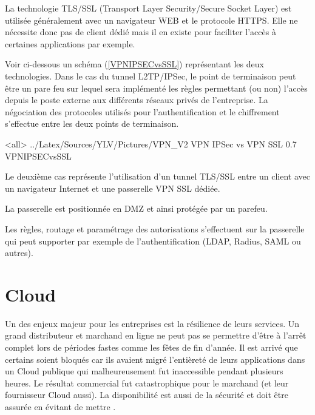 La technologie TLS/SSL (Transport Layer Security/Secure Socket Layer) est utilisée généralement avec un navigateur WEB et le protocole HTTPS. Elle ne nécessite donc pas de client dédié mais il en existe pour faciliter l'accès à certaines applications par exemple.

Voir ci-dessous un schéma (\ref{VPNIPSECvsSSL}) représentant les deux technologies.
Dans le cas du tunnel L2TP/IPSec, le point de terminaison peut être un pare feu sur lequel sera implémenté les règles permettant (ou non) l'accès depuis le poste externe aux différents réseaux privés de l'entreprise. La négociation des protocoles utilisés pour l'authentification et le chiffrement s'effectue entre les deux points de terminaison.

\mode<all>{\picframe
{../Latex/Sources/YLV/Pictures/VPN_V2}%
{VPN IPSec vs VPN SSL} %
{0.7} %
{VPNIPSECvsSSL} %
}

Le deuxième cas représente l'utilisation d'un tunnel TLS/SSL entre un client avec un navigateur Internet et une passerelle VPN SSL dédiée. 

La passerelle est positionnée en DMZ et ainsi protégée par un parefeu.

Les règles, routage et paramétrage des autorisations s'effectuent sur la passerelle qui peut supporter par exemple de l'authentification (LDAP, Radius, SAML ou autres).




\section{Cloud}


Un des enjeux majeur pour les entreprises est la résilience de leurs services. Un grand distributeur et marchand en ligne ne peut pas se permettre d'être à l'arrêt complet lors de périodes fastes comme les fêtes de fin d'année. Il est arrivé que certains soient bloqués car ils avaient migré l'entièreté de leurs applications dans un Cloud publique qui malheureusement fut inaccessible pendant plusieurs heures. Le résultat commercial fut catastrophique pour le marchand (et leur fournisseur Cloud aussi). 
La disponibilité est aussi de la sécurité et doit être assurée en évitant de mettre .
